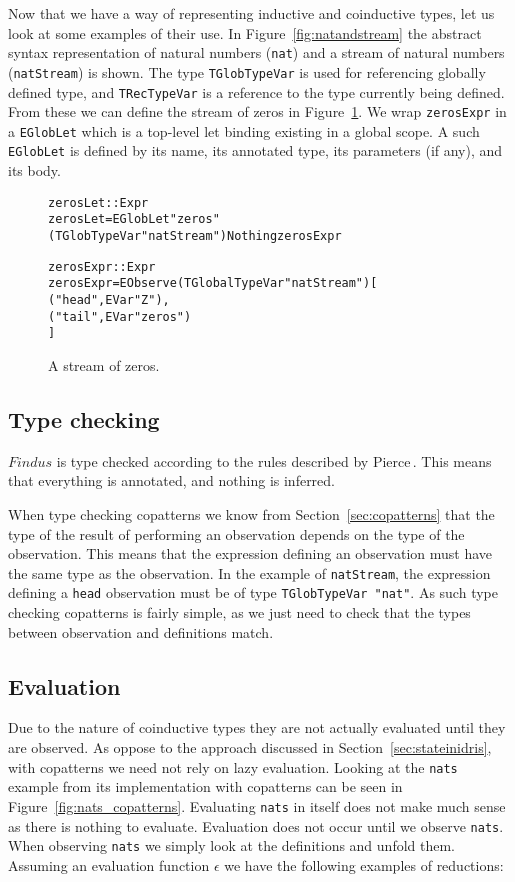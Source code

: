 Now that we have a way of representing inductive and coinductive types, let us look at some examples of their use. In Figure~\ref{fig:natandstream} the abstract syntax representation of natural numbers (\texttt{nat}) and a stream of natural numbers (\texttt{natStream}) is shown. The type \texttt{TGlobTypeVar} is used for referencing globally defined type, and \texttt{TRecTypeVar} is a reference to the type currently being defined. From these we can define the stream of zeros in Figure~\ref{fig:astzeros}. We wrap \texttt{zerosExpr} in a \texttt{EGlobLet} which is a top-level let binding existing in a global scope. A such \texttt{EGlobLet} is defined by its name, its annotated type, its parameters (if any), and its body.

\begin{figure}
\begin{alltt}
zerosLet :: Expr
zerosLet = EGlobLet "zeros" (TGlobTypeVar "natStream") Nothing zerosExpr

zerosExpr :: Expr
zerosExpr = EObserve (TGlobalTypeVar "natStream") [
            ("head", EVar "Z"),
            ("tail", EVar "zeros")
        ]
\end{alltt}
\caption{A stream of zeros.}
\label{fig:astzeros}
\end{figure}

\subsection{Type checking}
$Findus$ is type checked according to the rules described by Pierce\,\cite{Pierce:2002:TPL:509043}. This means that everything is annotated, and nothing is inferred.

When type checking copatterns we know from Section~\ref{sec:copatterns} that the type of the result of performing an observation depends on the type of the observation. This means that the expression defining an observation must have the same type as the observation. In the example of \texttt{natStream}, the expression defining a \texttt{head} observation must be of type \texttt{TGlobTypeVar "nat"}. As such type checking copatterns is fairly simple, as we just need to check that the types between observation and definitions match.

\subsection{Evaluation}
Due to the nature of coinductive types they are not actually evaluated until they are observed. As oppose to the approach discussed in Section~\ref{sec:stateinidris}, with copatterns we need not rely on lazy evaluation. Looking at the \texttt{nats} example from its implementation with copatterns can be seen in Figure~\ref{fig:nats_copatterns}. Evaluating \texttt{nats} in itself does not make much sense as there is nothing to evaluate. Evaluation does not occur until we observe \texttt{nats}. When observing \texttt{nats} we simply look at the definitions and unfold them. Assuming an evaluation function $\epsilon$ we have the following examples of reductions:

